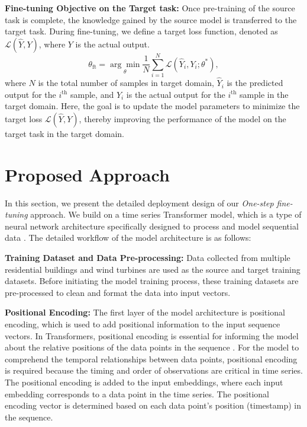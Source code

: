 \documentclass[letterpaper]{article} %
\begin{document}
\textbf{Fine-tuning Objective on the Target task:} Once pre-training of the source task is complete, the knowledge gained by the source model is transferred to the target task. During fine-tuning, we define a target loss function, denoted as $\mathcal{L}(\hat{Y}, Y)$, where $Y$ is the actual output.
\begin{equation}
    \theta_{\text{ft}} = \underset{\theta}{\arg\min}\frac{1}{N} \sum_{i=1}^{N} \mathcal{L}(\hat{Y}_{i}, Y_{i}; \theta^*),
\end{equation}
where $N$ is the total number of samples in target domain, $\hat{Y}_{i}$ is the predicted output for the $i^{\text{th}}$ sample, and $Y_{i}$ is the actual output for the $i^{\text{th}}$ sample in the target domain. Here, the goal is to update the model parameters to minimize the target loss $\mathcal{L}(\hat{Y}, Y)$, thereby improving the performance of the model on the target task in the target domain.

\section{Proposed Approach}
In this section, we present the detailed deployment design of our \emph{One-step fine-tuning} approach. We build on a  time series Transformer model, which is a type of neural network architecture specifically designed to process and model sequential data \cite{wen2022transformers}. The detailed workflow of the model architecture is as follows:

\textbf{Training Dataset and Data Pre-processing:} Data collected from multiple residential buildings and wind turbines are used as the source and target training datasets. Before initiating the model training process, these training datasets are pre-processed to clean and format the data into input vectors.

\textbf{Positional Encoding:} The first layer of the model architecture is positional encoding, which is used to add positional information to the input sequence vectors. In Transformers, positional encoding is essential for informing the model about the relative positions of the data points in the sequence \cite{vaswani2017attention}. For the model to comprehend the temporal relationships between data points, positional encoding is required because the timing and order of observations are critical in time series. The positional encoding is added to the input embeddings, where each input embedding corresponds to a data point in the time series. The positional encoding vector is determined based on each data point's position (timestamp) in the sequence.
\end{document}
